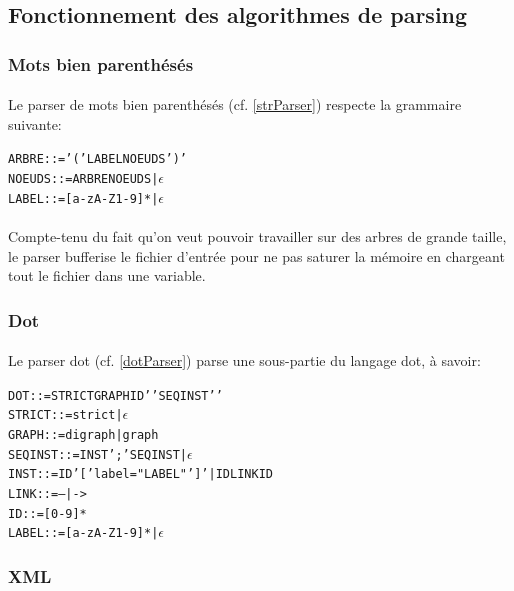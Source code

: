 

	\subsection{Fonctionnement des algorithmes de parsing}

		\subsubsection*{Mots bien parenthésés}
		
\paragraph{}Le parser de mots bien parenthésés (cf. \ref{strParser}) respecte la grammaire suivante:
		
\begin{alltt}
ARBRE ::= '(' LABEL NOEUDS ')'
NOEUDS ::= ARBRE NOEUDS | \( \epsilon \)
LABEL ::= [a-zA-Z1-9]* | \( \epsilon \)
\end{alltt}

\paragraph{} Compte-tenu du fait qu'on veut pouvoir travailler sur des arbres de grande taille, le parser bufferise le fichier d'entrée pour ne pas saturer la mémoire en chargeant tout le fichier dans une variable.

		\subsubsection*{Dot}
		
\paragraph{}Le parser dot (cf. \ref{dotParser}) parse une sous-partie du langage dot, à savoir:

\begin{alltt}
DOT ::= STRICT GRAPH ID '{' SEQINST '}'
STRICT ::= strict | \( \epsilon \)
GRAPH ::= digraph | graph
SEQINST ::= INST ';' SEQINST | \( \epsilon \)
INST ::= ID '[' label = "LABEL" ']' | ID LINK ID
LINK ::= -- | ->
ID ::= [0-9]*
LABEL ::= [a-zA-Z1-9]* | \( \epsilon \)
\end{alltt}

		\subsubsection*{XML}
		

